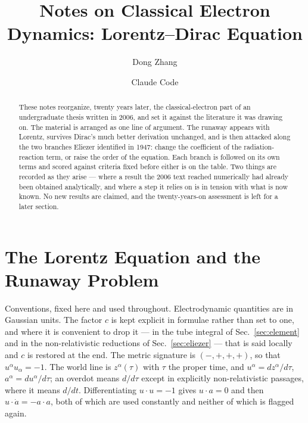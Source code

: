 \documentclass[preprint]{aastex701}
\newcommand{\note}[1]{{\color{blue}\textit{[#1]}}}
\begin{document}
\title{Notes on Classical Electron Dynamics:  Lorentz--Dirac Equation}

\author{Dong Zhang}

\author{Claude Code}

\begin{abstract}
These notes reorganize, twenty years later, the classical-electron part of an
undergraduate thesis written in 2006, and set it against the literature it was
drawing on. The material is arranged as one line of argument. The runaway
appears with Lorentz, survives Dirac's much better derivation unchanged, and is
then attacked along the two branches Eliezer identified in 1947: change the
coefficient of the radiation-reaction term, or raise the order of the equation.
Each branch is followed on its own terms and scored against criteria fixed
before either is on the table. Two things are recorded as they arise --- where
a result the 2006 text reached numerically had already been obtained
analytically, and where a step it relies on is in tension with what is now
known. No new results are claimed, and the twenty-years-on assessment is left
for a later section.
\end{abstract}


\section{The Lorentz Equation and the Runaway Problem}
\label{sec:lorentz}

Conventions, fixed here and used throughout. Electrodynamic quantities are in
Gaussian units. The factor $c$ is kept explicit in formulae rather than set to
one, and where it is convenient to drop it --- in the tube integral of
Sec.~\ref{sec:element} and in the non-relativistic reductions of
Sec.~\ref{sec:eliezer} --- that is said locally and $c$ is restored at the end.
The metric signature is $(-,+,+,+)$, so that $u^\alpha u_\alpha = -1$. The world
line is $z^\alpha(\tau)$ with $\tau$ the proper time, and
$u^\alpha = dz^\alpha/d\tau$, $a^\alpha = du^\alpha/d\tau$; an overdot means
$d/d\tau$ except in explicitly non-relativistic passages, where it means $d/dt$.
Differentiating $u\cdot u=-1$ gives $u\cdot a = 0$ and then
$u\cdot\dot a = -a\cdot a$, both of which are used constantly and neither of
which is flagged again.
\end{document}
